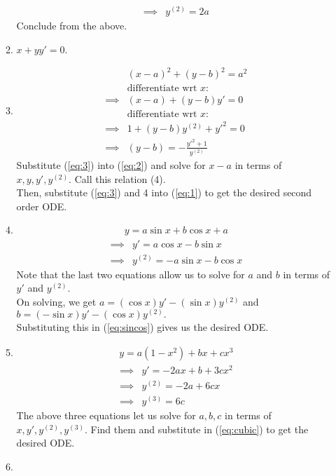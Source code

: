 \documentclass[12pt]{article}
\begin{document}
\begin{enumerate}[label = Q.\arabic*.]
\begin{enumerate}[label = (\roman*)]
\begin{align*}
			\implies & y^{(2)} = 2a
		\end{align*}
		Conclude from the above.
		\item $x + yy' = 0.$
		\item 
		\begin{align} 
			& (x - a)^2 + (y - b)^2 = a^2 \label{eq:1}\\
			&\text{differentiate wrt } x: \nonumber\\
			\implies & (x - a) + (y - b)y' = 0 \label{eq:2}\\
			&\text{differentiate wrt } x: \nonumber\\
			\implies & 1 + (y - b)y^{(2)} + y'^2 = 0 \nonumber\\
			\implies & (y - b) = -\frac{y'^2 + 1}{y^{(2)}} \label{eq:3}
		\end{align}
		Substitute (\ref{eq:3}) into (\ref{eq:2}) and solve for $x - a$ in terms of $x, y, y', y^{(2)}.$ Call this relation (4).\\
		Then, substitute (\ref{eq:3}) and 4 into (\ref{eq:1}) to get the desired second order ODE.
		\item 
		\begin{align} \label{eq:sincos}
			y = a\sin x + b\cos x + a
		\end{align}
		\begin{align*} 
			\implies & y' = a\cos x - b\sin x\\
			\implies & y^{(2)} = -a\sin x - b\cos x
		\end{align*}
		Note that the last two equations allow us to solve for $a$ and $b$ in terms of $y'$ and $y^{(2)}.$\\
		On solving, we get $a = (\cos x)y' - (\sin x)y^{(2)}$ and $b = (-\sin x)y' - (\cos x)y^{(2)}.$\\
		Substituting this in (\ref{eq:sincos}) gives us the desired ODE.
		\item 
		\begin{align} \label{eq:cubic}
			y = a(1 - x^2) + bx + cx^3
		\end{align}
		\begin{align*} 
			\implies & y' = -2ax + b + 3cx^2\\
			\implies & y^{(2)} = -2a + 6cx\\
			\implies & y^{(3)} = 6c
		\end{align*}
		The above three equations let us solve for $a, b, c$ in terms of $x, y', y^{(2)}, y^{(3)}.$ Find them and substitute in (\ref{eq:cubic}) to get the desired ODE.
		\item 

\end{enumerate}
\end{enumerate}
\end{document}

